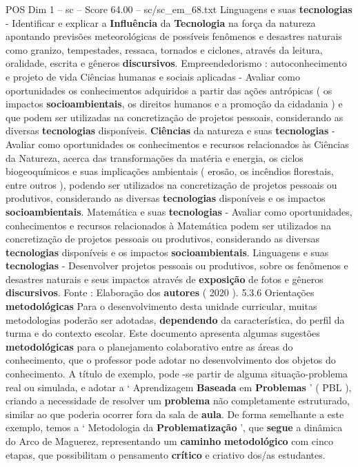 \begin{textsample}{POS Dim 1 – sc – Score 64.00 – sc/sc\_em\_68.txt}
Linguagens e suas \textbf{tecnologias} - Identificar e explicar a \textbf{Influência} da \textbf{Tecnologia} na força da natureza apontando previsões meteorológicas de possíveis fenômenos e desastres naturais como granizo, tempestades, ressaca, tornados e ciclones, através da leitura, oralidade, escrita e gêneros \textbf{discursivos}.
Empreendedorismo : autoconhecimento e projeto de vida Ciências humanas e sociais aplicadas - Avaliar como oportunidades os conhecimentos adquiridos a partir das ações antrópicas ( os impactos \textbf{socioambientais}, os direitos humanos e a promoção da cidadania ) e que podem ser utilizadas na concretização de projetos pessoais, considerando as diversas \textbf{tecnologias} disponíveis. \textbf{Ciências} da natureza e suas \textbf{tecnologias} - Avaliar como oportunidades os conhecimentos e recursos relacionados às Ciências da Natureza, acerca das transformações da matéria e energia, os ciclos biogeoquímicos e suas implicações ambientais ( erosão, os incêndios florestais, entre outros ), podendo ser utilizados na concretização de projetos pessoais ou produtivos, considerando as diversas \textbf{tecnologias} disponíveis e os impactos \textbf{socioambientais}.
Matemática e suas \textbf{tecnologias} - Avaliar como oportunidades, conhecimentos e recursos relacionados à Matemática podem ser utilizados na concretização de projetos pessoais ou produtivos, considerando as diversas \textbf{tecnologias} disponíveis e os impactos \textbf{socioambientais}.
Linguagens e suas \textbf{tecnologias} - Desenvolver projetos pessoais ou produtivos, sobre os fenômenos e desastres naturais e seus impactos através de \textbf{exposição} de fotos e gêneros \textbf{discursivos}.
Fonte : Elaboração dos \textbf{autores} ( 2020 ). 5.3.6 Orientações \textbf{metodológicas} Para o desenvolvimento desta unidade curricular, muitas metodologias poderão ser adotadas, \textbf{dependendo} da característica, do perfil da turma e do contexto escolar.
Este documento apresenta algumas sugestões \textbf{metodológicas} para o planejamento colaborativo entre as áreas do conhecimento, que o professor pode adotar no desenvolvimento dos objetos do conhecimento.
A título de exemplo, pode -se partir de alguma situação-problema real ou simulada, e adotar a ‘ Aprendizagem \textbf{Baseada} em \textbf{Problemas} ’ ( PBL ), criando a necessidade de resolver um \textbf{problema} não completamente estruturado, similar ao que poderia ocorrer fora da sala de \textbf{aula}.
De forma semelhante a este exemplo, temos a ‘ Metodologia da \textbf{Problematização} ’, que \textbf{segue} a dinâmica do Arco de Maguerez, representando um \textbf{caminho} \textbf{metodológico} com cinco etapas, que possibilitam o pensamento \textbf{crítico} e criativo dos/as estudantes.

\end{textsample}

